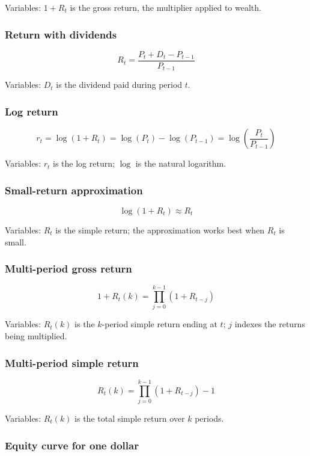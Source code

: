 \documentclass[
  8pt,
  twocolumn]{extarticle}
\begin{document}
Variables: \(1+R_t\) is the gross return, the multiplier applied to
wealth.

\subsubsection{Return with dividends}\label{return-with-dividends}

\[
R_t=\frac{P_t+D_t-P_{t-1}}{P_{t-1}}
\]

Variables: \(D_t\) is the dividend paid during period \(t\).

\subsubsection{Log return}\label{log-return}

\[
r_t=\log(1+R_t)=\log(P_t)-\log(P_{t-1})=\log\left(\frac{P_t}{P_{t-1}}\right)
\]

Variables: \(r_t\) is the log return; \(\log\) is the natural logarithm.

\subsubsection{Small-return
approximation}\label{small-return-approximation}

\[
\log(1+R_t)\approx R_t
\]

Variables: \(R_t\) is the simple return; the approximation works best
when \(R_t\) is small.

\subsubsection{Multi-period gross
return}\label{multi-period-gross-return}

\[
1+R_t(k)=\prod_{j=0}^{k-1}(1+R_{t-j})
\]

Variables: \(R_t(k)\) is the \(k\)-period simple return ending at \(t\);
\(j\) indexes the returns being multiplied.

\subsubsection{Multi-period simple
return}\label{multi-period-simple-return}

\[
R_t(k)=\prod_{j=0}^{k-1}(1+R_{t-j})-1
\]

Variables: \(R_t(k)\) is the total simple return over \(k\) periods.

\subsubsection{Equity curve for one
dollar}\label{equity-curve-for-one-dollar}
\end{document}
